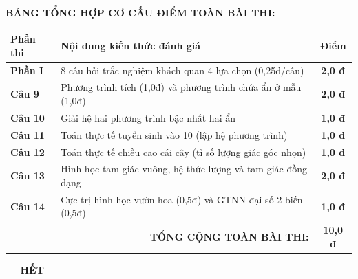 \documentclass[12pt,a4paper]{article}
\begin{document}
\noindent\textbf{\large BẢNG TỔNG HỢP CƠ CẤU ĐIỂM TOÀN BÀI THI:}
\begin{center}
\small
\renewcommand{\arraystretch}{1.1}
\begin{tabular}{|l|p{11.8cm}|c|}
\hline
\textbf{Phần thi} & \textbf{Nội dung kiến thức đánh giá} & \textbf{Điểm} \\
\hline
\textbf{Phần I} & 8 câu hỏi trắc nghiệm khách quan 4 lựa chọn (0,25đ/câu) & \textbf{2,0 đ} \\
\hline
\textbf{Câu 9} & Phương trình tích (1,0đ) và phương trình chứa ẩn ở mẫu (1,0đ) & \textbf{2,0 đ} \\
\hline
\textbf{Câu 10} & Giải hệ hai phương trình bậc nhất hai ẩn & \textbf{1,0 đ} \\
\hline
\textbf{Câu 11} & Toán thực tế tuyển sinh vào 10 (lập hệ phương trình) & \textbf{1,0 đ} \\
\hline
\textbf{Câu 12} & Toán thực tế chiều cao cái cây (tỉ số lượng giác góc nhọn) & \textbf{1,0 đ} \\
\hline
\textbf{Câu 13} & Hình học tam giác vuông, hệ thức lượng và tam giác đồng dạng & \textbf{2,0 đ} \\
\hline
\textbf{Câu 14} & Cực trị hình học vườn hoa (0,5đ) và GTNN đại số 2 biến (0,5đ) & \textbf{1,0 đ} \\
\hline
\multicolumn{2}{|r|}{\textbf{TỔNG CỘNG TOÀN BÀI THI:}} & \textbf{10,0 đ} \\
\hline
\end{tabular}
\end{center}

\vspace{1mm}
\begin{center}
  \textbf{--- HẾT ---}
\end{center}
\end{document}
